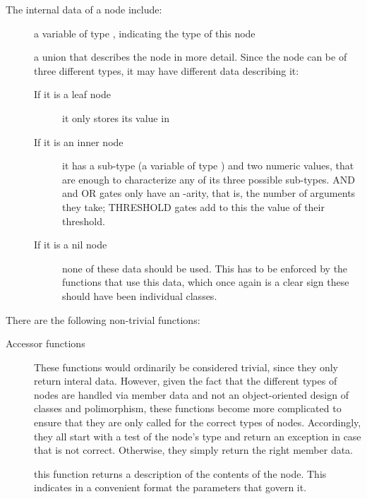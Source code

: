 \documentclass{article}
\begin{document}
The internal data of a node include:
\begin{description}
\item[] a variable of type , indicating the type of this node
\item[] a union that describes the node in more detail. Since the node can be of three different types, it may have different data describing it:
\begin{description}
\item[If it is a leaf node] it only stores its value in 
\item[If it is an inner node] it has a sub-type (a variable of type ) and two numeric values, that are enough to characterize any of its three possible sub-types. AND and OR gates only have an -arity, that is, the number of arguments they take; THRESHOLD gates add to this the value of their threshold.
\item[If it is a nil node] none of these data should be used. This has to be enforced by the functions that use this data, which once again is a clear sign these should have been individual classes.
\end{description}
\end{description}

There are the following non-trivial functions:
\begin{description}
\item[Accessor functions] These functions would ordinarily be considered trivial, since they only return interal data. However, given the fact that the different types of nodes are handled via member data and not an object-oriented design of classes and polimorphism, these functions become more complicated to ensure that they are only called for the correct types of nodes. Accordingly, they all start with a test of the node's type and return an exception in case that is not correct. Otherwise, they simply return the right member data.
	\begin{description}
	\item[] 
	\item[] 
	\item[] 
	\item[] 
	\end{description}
\item[] this function returns a \cstring description of the contents of the node. This indicates in a convenient format the parameters that govern it.
\end{description}
\end{document}
